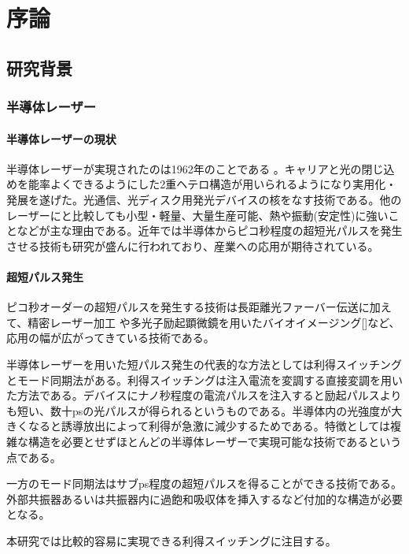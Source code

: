 \chapter{序論}
\section{研究背景}
\subsection{半導体レーザー}
\subsubsection{半導体レーザーの現状}
半導体レーザーが実現されたのは1962年のことである 。キャリアと光の閉じ込めを能率よくできるようにした2重ヘテロ構造が用いられるようになり実用化・発展を遂げた。光通信、光ディスク用発光デバイスの核をなす技術である。他のレーザーにと比較しても小型・軽量、大量生産可能、熱や振動(安定性)に強いことなどが主な理由である。近年では半導体からピコ秒程度の超短光パルスを発生させる技術も研究が盛んに行われており、産業への応用が期待されている。
\subsubsection{超短パルス発生}
ピコ秒オーダーの超短パルスを発生する技術は長距離光ファーバー伝送\cite{ref_hasegawa}に加えて、精密レーザー加工\cite{ref_chichkov} や多光子励起顕微鏡を用いたバイオイメージング[]など、応用の幅が広がってきている技術である。

半導体レーザーを用いた短パルス発生の代表的な方法としては利得スイッチングとモード同期法がある。利得スイッチング\cite{ref_h_ito}は注入電流を変調する直接変調を用いた方法である。デバイスにナノ秒程度の電流パルスを注入すると励起パルスよりも短い、数十psの光パルスが得られるというものである。半導体内の光強度が大きくなると誘導放出によって利得が急激に減少するためである。特徴としては複雑な構造を必要とせずほとんどの半導体レーザーで実現可能な技術であるという点である。

一方のモード同期法はサブps程度の超短パルスを得ることができる技術である。外部共振器あるいは共振器内に過飽和吸収体を挿入するなど付加的な構造が必要となる。

本研究では比較的容易に実現できる利得スイッチングに注目する。

